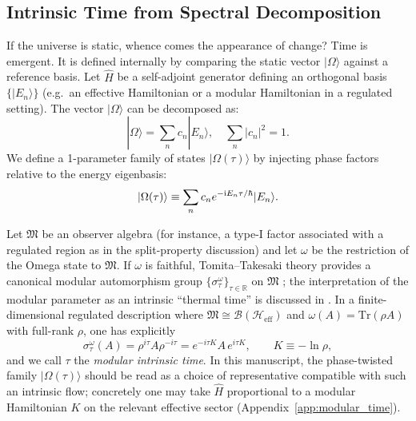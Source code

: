 \subsection{Intrinsic Time from Spectral Decomposition}
If the universe is static, whence comes the appearance of change? Time is emergent. It is defined internally by comparing the static vector $|\Omega\rangle$ against a reference basis.
Let $\hat{H}$ be a self-adjoint generator defining an orthogonal basis $\{|E_n\rangle\}$ (e.g.\ an effective Hamiltonian or a modular Hamiltonian in a regulated setting). The vector $|\Omega\rangle$ can be decomposed as:
\begin{equation}
    |\Omega\rangle = \sum_n c_n |E_n\rangle, \quad \sum_n |c_n|^2 = 1.
\end{equation}
We define a 1-parameter family of states $|\Omega(\tau)\rangle$ by injecting phase factors relative to the energy eigenbasis:
\begin{equation}
    |\Omega(\tau)\rangle \equiv \sum_n c_n e^{-\mathrm{i} E_n \tau/\hbar} |E_n\rangle.
\end{equation}
\begin{definition}
\label{def:modular_time}
Let $\mathfrak{M}$ be an observer algebra (for instance, a type-I factor associated with a regulated region as in the split-property discussion) and let $\omega$ be the restriction of the Omega state to $\mathfrak{M}$. If $\omega$ is faithful, Tomita--Takesaki theory provides a canonical modular automorphism group $\{\sigma_\tau^\omega\}_{\tau\in\mathbb{R}}$ on $\mathfrak{M}$ \cite{Takesaki2002}; the interpretation of the modular parameter as an intrinsic ``thermal time'' is discussed in \cite{ConnesRovelli1994}. In a finite-dimensional regulated description where $\mathfrak{M}\cong\mathcal{B}(\mathcal{H}_{\mathrm{eff}})$ and $\omega(A)=\mathrm{Tr}(\rho A)$ with full-rank $\rho$, one has explicitly
\begin{equation}
    \sigma_\tau^\omega(A)=\rho^{i\tau}A\rho^{-i\tau}=e^{-i\tau K}A\,e^{i\tau K},\qquad K\equiv -\ln\rho,
\end{equation}
and we call $\tau$ the \emph{modular intrinsic time}. In this manuscript, the phase-twisted family $|\Omega(\tau)\rangle$ should be read as a choice of representative compatible with such an intrinsic flow; concretely one may take $\hat H$ proportional to a modular Hamiltonian $K$ on the relevant effective sector (Appendix~\ref{app:modular_time}).
\end{definition}

